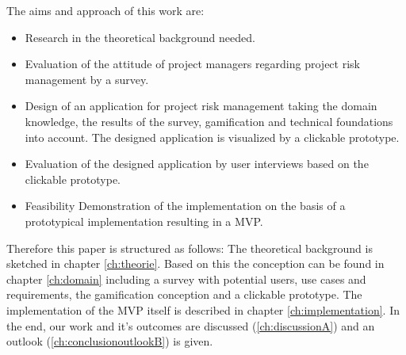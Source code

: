 The aims and approach of this work are:
\begin{itemize}
	\item Research in the theoretical background needed.
	\item Evaluation of the attitude of project managers regarding project risk management by a survey.
	\item Design of an application for project risk management taking 
	the domain knowledge, the results of the survey, gamification and technical foundations into account. The designed application is visualized by a clickable prototype.
	\item Evaluation of the designed application by user interviews based on the clickable prototype.
	\item Feasibility Demonstration of the implementation on the basis of a prototypical implementation resulting in a \ac{MVP}.
\end{itemize}

Therefore this paper is structured as follows:
The theoretical background is sketched in chapter \ref{ch:theorie}. Based on this the conception can be found in chapter \ref{ch:domain} including a survey with potential users, use cases and requirements, the gamification conception and a clickable prototype. The implementation of the \acs{MVP} itself is described in chapter \ref{ch:implementation}. In the end, our work and it's outcomes are discussed (\ref{ch:discussionA}) and an outlook (\ref{ch:conclusionoutlookB}) is given.


%
%

